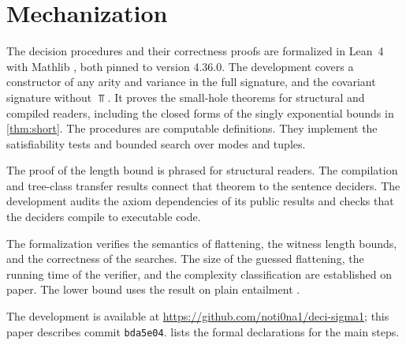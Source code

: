 \section{Mechanization}
\label{sec:mechanization}

The decision procedures and their correctness proofs are formalized in
Lean~4 \cite{MouraUllrich21} with Mathlib \cite{Mathlib20}, both pinned to
version 4.36.0. The development covers a constructor of any arity and variance in the full signature,
and the covariant signature without $\Top$. It proves the small-hole
theorems for structural and compiled readers, including the closed
forms of the singly exponential bounds in \cref{thm:short}.
The procedures are computable definitions. They implement the
satisfiability tests and bounded search over modes and tuples.

The proof of the length bound is phrased for structural readers.
The compilation and tree-class transfer results connect that theorem
to the sentence deciders. The development audits the axiom dependencies
of its public results and checks that the deciders compile to executable
code.

The formalization verifies the semantics of flattening, the witness
length bounds, and the correctness of the searches. The size of the
guessed flattening, the running time of the verifier, and the
complexity classification are established on paper. The lower bound
uses the result on plain entailment \cite{NSSE26}.

The development is available at \url{https://github.com/noti0na1/deci-sigma1}; this paper
describes commit \texttt{bda5e04}.
 lists the formal declarations for the main steps.
